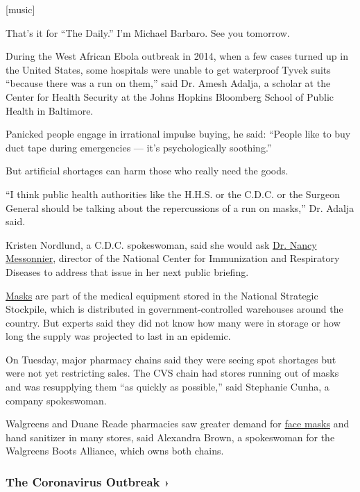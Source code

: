 {[}music{]}

That's it for ``The Daily.'' I'm Michael Barbaro. See you tomorrow.

During the West African Ebola outbreak in 2014, when a few cases turned
up in the United States, some hospitals were unable to get waterproof
Tyvek suits ``because there was a run on them,'' said Dr. Amesh Adalja,
a scholar at the Center for Health Security at the Johns Hopkins
Bloomberg School of Public Health in Baltimore.

Panicked people engage in irrational impulse buying, he said: ``People
like to buy duct tape during emergencies --- it's psychologically
soothing.''

But artificial shortages can harm those who really need the goods.

``I think public health authorities like the H.H.S. or the C.D.C. or the
Surgeon General should be talking about the repercussions of a run on
masks,'' Dr. Adalja said.

Kristen Nordlund, a C.D.C. spokeswoman, said she would ask
\href{https://www.cdc.gov/about/leadership/leaders/ncird.html}{Dr. Nancy
Messonnier}, director of the National Center for Immunization and
Respiratory Diseases to address that issue in her next public briefing.

\href{https://www.nytimes.com/2020/03/22/business/coronavirus-n95-masks-target.html}{Masks}
are part of the medical equipment stored in the National Strategic
Stockpile, which is distributed in government-controlled warehouses
around the country. But experts said they did not know how many were in
storage or how long the supply was projected to last in an epidemic.

On Tuesday, major pharmacy chains said they were seeing spot shortages
but were not yet restricting sales. The CVS chain had stores running out
of masks and was resupplying them ``as quickly as possible,'' said
Stephanie Cunha, a company spokeswoman.

Walgreens and Duane Reade pharmacies saw greater demand for
\href{https://www.nytimes.com/2020/02/29/health/coronavirus-n95-face-masks.html}{face
masks} and hand sanitizer in many stores, said Alexandra Brown, a
spokeswoman for the Walgreens Boots Alliance, which owns both chains.

\href{https://www.nytimes.com/news-event/coronavirus?action=click\&pgtype=Article\&state=default\&region=MAIN_CONTENT_3\&context=storylines_faq}{}

\hypertarget{the-coronavirus-outbreak-}{%
\subsubsection{The Coronavirus Outbreak
›}\label{the-coronavirus-outbreak-}}

